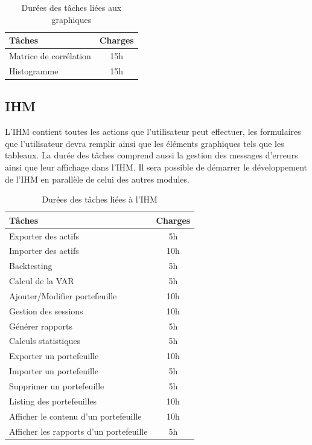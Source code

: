 \documentclass[a4paper]{report}
\begin{document}
\begin{table}[H]
\centering
  \begin{tabularx}{0.8\textwidth}{| X | c |}
    \hline
	Tâches & Charges \\
    \hline
    Matrice de corrélation &  15h \\
    Histogramme &  15h \\
    \hline
  \end{tabularx}
  \caption{Durées des tâches liées aux graphiques}
\end{table}


\subsection{IHM}
L'IHM contient toutes les actions que l'utilisateur peut effectuer, les formulaires que l'utilisateur devra remplir ainsi que les éléments graphiques tels que les tableaux. La durée des tâches comprend aussi la gestion des messages d'erreurs ainsi que leur affichage dans l'IHM. Il sera possible de démarrer le développement de l'IHM en parallèle de celui des autres modules.

\begin{table}[H]
\centering
  \begin{tabularx}{0.8\textwidth}{| X | c |}
    \hline
	Tâches & Charges \\
    \hline
    Exporter des actifs & 5h\\
    Importer des actifs & 10h\\
    Backtesting & 5h\\
    Calcul de la VAR & 5h\\
    Ajouter/Modifier portefeuille & 10h\\
    Gestion des sessions & 10h\\
    Générer rapports & 5h\\
    Calculs statistiques & 5h\\
    Exporter un portefeuille & 10h\\
    Importer un portefeuille & 5h\\
    Supprimer un portefeuille & 5h\\
    Listing des portefeuilles & 10h \\
    Afficher le contenu d'un portefeuille & 10h \\
    Afficher les rapports d'un portefeuille & 5h \\
    \hline
  \end{tabularx}
  \caption{Durées des tâches liées à l'IHM}
\end{table}
\end{document}
